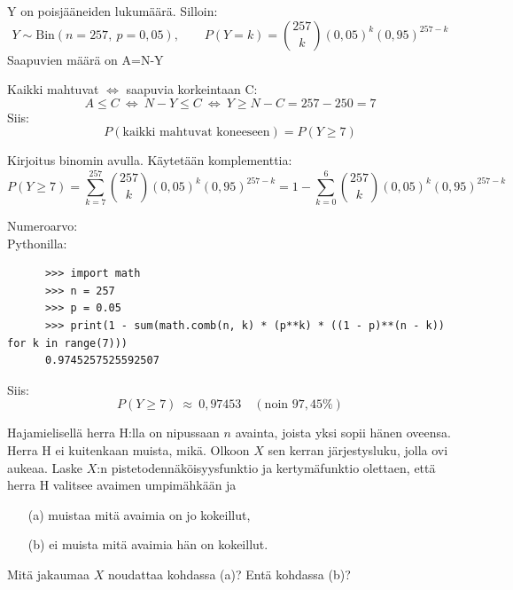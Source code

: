 \documentclass[12pt,a4paper]{article}
\begin{document}
\begin{alakohta}
  \item Y on poisjääneiden lukumäärä. Silloin:
  \[
    Y \sim \mathrm{Bin}(n=257,\ p=0{,}05),\qquad
    P(Y=k)=\binom{257}{k}(0{,}05)^k(0{,}95)^{257-k}
  \]
  Saapuvien määrä on A=N-Y

  \item Kaikki mahtuvat $\iff$ saapuvia korkeintaan C:
  \[
    A \le C\ \Longleftrightarrow\ N - Y \le C\ \Longleftrightarrow\ Y \ge N-C = 257-250=7
  \]
  Siis:
  \[
    P(\text{kaikki mahtuvat koneeseen})=P(Y\ge 7)
  \]

  \item Kirjoitus binomin avulla. Käytetään komplementtia:
  \[
    P(Y\ge 7)
    = \sum_{k=7}^{257}\binom{257}{k}(0{,}05)^k(0{,}95)^{257-k}
    = 1 - \sum_{k=0}^{6}\binom{257}{k}(0{,}05)^k(0{,}95)^{257-k}
  \]

  \item Numeroarvo:\\

   Pythonilla:
   {\small
   \begin{verbatim}
      >>> import math
      >>> n = 257
      >>> p = 0.05
      >>> print(1 - sum(math.comb(n, k) * (p**k) * ((1 - p)**(n - k)) for k in range(7)))
      0.9745257525592507
   \end{verbatim}
   }

   Siis:
  \[
    P(Y\ge 7)\ \approx\ 0{,}97453 \quad (\text{noin }97{,}45\%)
  \]


\end{alakohta}






\pagebreak
{}
Hajamielisellä herra H:lla on nipussaan $n$ avainta, 
joista yksi sopii hänen oveensa.
Herra H ei kuitenkaan muista, mikä. Olkoon $X$ sen kerran 
järjestysluku, jolla ovi aukeaa. Laske $X$:n 
pistetodennäköisyysfunktio ja kertymäfunktio olettaen, että herra
H valitsee avaimen umpimähkään ja
\begin{enumerate}
\item[(a)] muistaa mitä avaimia on jo kokeillut,
\item[(b)] ei muista mitä avaimia hän on kokeillut.
\end{enumerate}
Mitä jakaumaa $X$ noudattaa kohdassa (a)? Entä kohdassa (b)?
\vspace{0.4cm}
\end{document}
